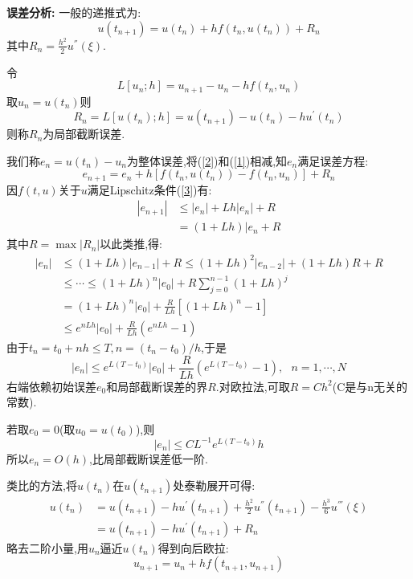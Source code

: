 \documentclass[12pt,a4paper]{article}
\begin{document}
\par 
\textbf{误差分析:}
一般的递推式为:
\begin{equation}
u(t_{n+1})=u(t_{n})+hf(t_{n},u(t_{n}))+R_{n}
\label{2}
\end{equation}
其中$R_{n}=\frac{h^2}{2}u^{''}(\xi)$.

令
\begin{equation}
L[u_{n};h]=u_{n+1}-u_{n}-hf(t_{n},u_{n})
\end{equation}
取$u_{n}=u(t_{n})$则
\begin{equation}
R_{n}=L[u(t_{n});h]=u(t_{n+1})-u(t_{n})-hu^{'}(t_{n})
\end{equation}
则称$R_{n}$为局部截断误差.

我们称$e_{n}=u(t_{n})-u_{n}$为整体误差,将(\ref{2})和(\ref{1})相减,知$e_{n}$满足误差方程:
\begin{equation}
e_{n+1}=e_{n}+h[f(t_{n},u(t_{n}))-f(t_{n},u_{n})]+R_{n}
\label{3}
\end{equation}
因$f(t,u)$关于$u$满足Lipschitz条件(\ref{3})有:
\begin{align}
|e_{n+1}|&\le|e_{n}|+Lh|e_{n}|+R\\
&=(1+Lh)|e_{n}+R
\end{align}
其中$R=\max|R_{n}|$以此类推,得:
\begin{align}
|e_{n}|&\le (1+Lh)|e_{n-1}|+R\le (1+Lh)^2|e_{n-2}|+(1+Lh)R+R\\
&\le \cdots\le (1+Lh)^n|e_{0}|+R\sum_{j=0}^{n-1}(1+Lh)^j\\
&=(1+Lh)^n|e_{0}|+\frac{R}{Lh}[(1+Lh)^n-1]\\
&\le e^{nLh}|e_{0}|+\frac{R}{Lh}(e^{nLh}-1)
\end{align}
由于$t_{n}=t_{0}+nh\le T,n=(t_{n}-t_{0})/h$,于是
\begin{equation}
|e_{n}|\le e^{L(T-t_{0})}|e_{0}|+\frac{R}{Lh}(e^{L(T-t_{0})}-1),~~~n=1,\cdots,N
\end{equation}
右端依赖初始误差$e_{0}$和局部截断误差的界$R$.对欧拉法,可取$R=Ch^2$(C是与n无关的常数).

若取$e_{0}=0$(取$u_{0}=u(t_{0})$),则
\begin{equation}
|e_{n}|\le CL^{-1}e^{L(T-t_{0})}h
\end{equation}
所以$e_{n}=O(h)$,比局部截断误差低一阶.

类比的方法,将$u(t_{n})$在$u({t_{n+1}})$处泰勒展开可得:
\begin{align}
u(t_{n})&=u(t_{n+1})-hu^{'}(t_{n+1})+\frac{h^2}{2}u^{''}(t_{n+1})-\frac{h^3}{6}u^{'''}(\xi)\\&=u(t_{n+1})-hu^{'}(t_{n+1})+R_{n}
\end{align}
略去二阶小量,用$u_{n}$逼近$u(t_{n})$得到向后欧拉:
\begin{equation}
u_{n+1}=u_{n}+hf(t_{n+1},u_{n+1})
\end{equation}
\end{document}
